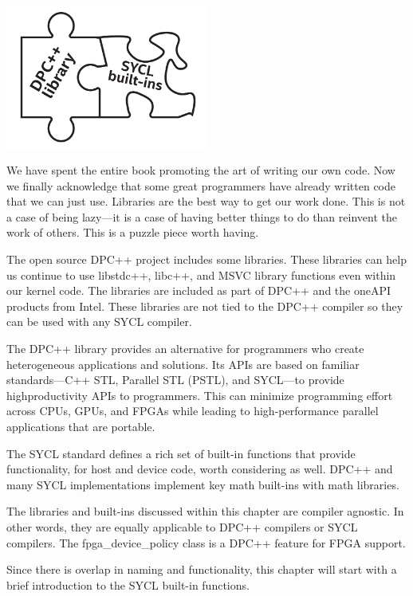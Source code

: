 \begin{center}
	\includegraphics[width=0.5\textwidth]{content/chapter-18/images/1}
\end{center}

We have spent the entire book promoting the art of writing our own code. Now we finally acknowledge that some great programmers have already written code that we can just use. Libraries are the best way to get our work done. This is not a case of being lazy—it is a case of having better things to do than reinvent the work of others. This is a puzzle piece worth having.\par

The open source DPC++ project includes some libraries. These libraries can help us continue to use libstdc++, libc++, and MSVC library functions even within our kernel code. The libraries are included as part of DPC++ and the oneAPI products from Intel. These libraries are not tied to the DPC++ compiler so they can be used with any SYCL compiler.\par

The DPC++ library provides an alternative for programmers who create heterogeneous applications and solutions. Its APIs are based on familiar standards—C++ STL, Parallel STL (PSTL), and SYCL—to provide highproductivity APIs to programmers. This can minimize programming effort across CPUs, GPUs, and FPGAs while leading to high-performance parallel applications that are portable.\par

The SYCL standard defines a rich set of built-in functions that provide functionality, for host and device code, worth considering as well. DPC++ and many SYCL implementations implement key math built-ins with math libraries.\par

The libraries and built-ins discussed within this chapter are compiler agnostic. In other words, they are equally applicable to DPC++ compilers or SYCL compilers. The fpga\_device\_policy class is a DPC++ feature for FPGA support.\par

Since there is overlap in naming and functionality, this chapter will start with a brief introduction to the SYCL built-in functions.\par



















